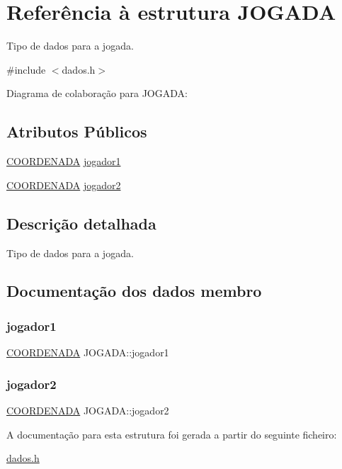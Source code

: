 \hypertarget{structJOGADA}{}\section{Referência à estrutura J\+O\+G\+A\+DA}
\label{structJOGADA}


Tipo de dados para a jogada.  




{\ttfamily \#include $<$dados.\+h$>$}



Diagrama de colaboração para J\+O\+G\+A\+DA\+:
\subsection*{Atributos Públicos}
\begin{DoxyCompactItemize}
\item 
\hyperlink{structCOORDENADA}{C\+O\+O\+R\+D\+E\+N\+A\+DA} \hyperlink{structJOGADA_a93d9306cb0c49b66b7d9a615bffe0149}{jogador1}
\item 
\hyperlink{structCOORDENADA}{C\+O\+O\+R\+D\+E\+N\+A\+DA} \hyperlink{structJOGADA_ab46b16dfbdc7f2af9430c8dcdac0914b}{jogador2}
\end{DoxyCompactItemize}


\subsection{Descrição detalhada}
Tipo de dados para a jogada. 

\subsection{Documentação dos dados membro}
\mbox{\label{structJOGADA_a93d9306cb0c49b66b7d9a615bffe0149}} 
\subsubsection{\texorpdfstring{jogador1}{jogador1}}
{\footnotesize\ttfamily \hyperlink{structCOORDENADA}{C\+O\+O\+R\+D\+E\+N\+A\+DA} J\+O\+G\+A\+D\+A\+::jogador1}

\mbox{\label{structJOGADA_ab46b16dfbdc7f2af9430c8dcdac0914b}} 
\subsubsection{\texorpdfstring{jogador2}{jogador2}}
{\footnotesize\ttfamily \hyperlink{structCOORDENADA}{C\+O\+O\+R\+D\+E\+N\+A\+DA} J\+O\+G\+A\+D\+A\+::jogador2}



A documentação para esta estrutura foi gerada a partir do seguinte ficheiro\+:\begin{DoxyCompactItemize}
\item 
\hyperlink{dados_8h}{dados.\+h}\end{DoxyCompactItemize}
